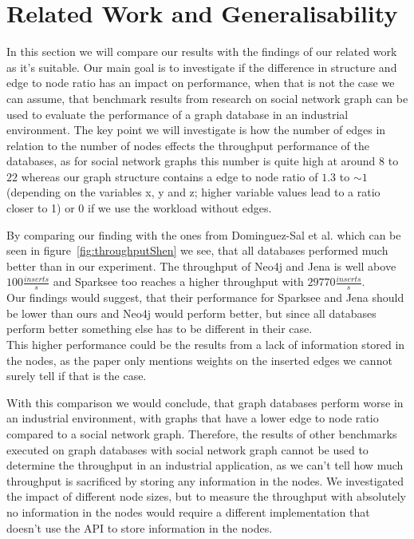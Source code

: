 \section{Related Work and Generalisability}
\label{ch:evaluation:se:relatedWorkAndGeneralisability}
In this section we will compare our results with the findings of our related work as it's suitable.
Our main goal is to investigate if the difference in structure and edge to node ratio has an impact on performance,
when that is not the case we can assume,
that benchmark results from research on social network graph can be used to evaluate the performance of a graph database in an industrial environment.
The key point we will investigate is how the number of edges in relation to the number of nodes effects the throughput performance of the databases,
as for social network graphs this number is quite high at around $ 8 $\cite[41]{TaoShen} to $ 22 $\cite{Dayarathna2012} whereas our graph structure contains a edge to node ratio of $ 1.3 $ to $ \sim1 $ (depending on the variables x, y and z; higher variable values lead to a ratio closer to 1) or $ 0 $ if we use the workload without edges.

By comparing our finding with the ones from Dominguez-Sal et al.\cite{TaoShen} which can be seen in figure~\ref{fig:throughputShen} we see,
that all databases performed much better than in our experiment.
The throughput of Neo4j and Jena is well above $ 100 \frac{inserts}{s} $ and Sparksee too reaches a higher throughput with $ 29770 \frac{inserts}{s} $.\\
Our findings would suggest,
that their performance for Sparksee and Jena should be lower than ours and Neo4j would perform better,
but since all databases perform better something else has to be different in their case.\\
This higher performance could be the results from a lack of information stored in the nodes,
as the paper only mentions weights on the inserted edges we cannot surely tell if that is the case.

With this comparison we would conclude,
that graph databases perform worse in an industrial environment,
with graphs that have a lower edge to node ratio compared to a social network graph.
Therefore,
the results of other benchmarks executed on graph databases with social network graph cannot be used to determine the throughput in an industrial application,
as we can't tell how much throughput is sacrificed by storing any information in the nodes.
We investigated the impact of different node sizes,
but to measure the throughput with absolutely no information in the nodes would require a different implementation that doesn't use the API to store information in the nodes.

